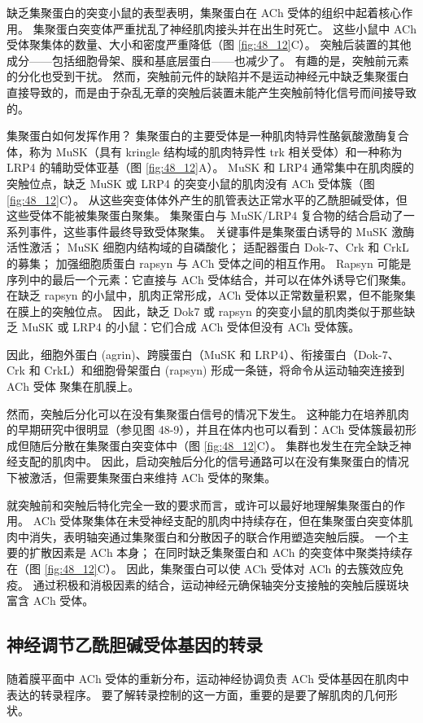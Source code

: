 缺乏集聚蛋白的突变小鼠的表型表明，集聚蛋白在 ACh 受体的组织中起着核心作用。 集聚蛋白突变体严重扰乱了神经肌肉接头并在出生时死亡。 这些小鼠中 ACh 受体聚集体的数量、大小和密度严重降低（图 \ref{fig:48_12}C）。 突触后装置的其他成分——包括细胞骨架、膜和基底层蛋白——也减少了。 有趣的是，突触前元素的分化也受到干扰。 然而，突触前元件的缺陷并不是运动神经元中缺乏集聚蛋白直接导致的，而是由于杂乱无章的突触后装置未能产生突触前特化信号而间接导致的。

集聚蛋白如何发挥作用？ 集聚蛋白的主要受体是一种肌肉特异性酪氨酸激酶复合体，称为 MuSK（具有 kringle 结构域的肌肉特异性 trk 相关受体）和一种称为 LRP4 的辅助受体亚基（图 \ref{fig:48_12}A）。 MuSK 和 LRP4 通常集中在肌肉膜的突触位点，缺乏 MuSK 或 LRP4 的突变小鼠的肌肉没有 ACh 受体簇（图 \ref{fig:48_12}C）。 从这些突变体体外产生的肌管表达正常水平的乙酰胆碱受体，但这些受体不能被集聚蛋白聚集。 集聚蛋白与 MuSK/LRP4 复合物的结合启动了一系列事件，这些事件最终导致受体聚集。 关键事件是集聚蛋白诱导的 MuSK 激酶活性激活； MuSK 细胞内结构域的自磷酸化； 适配器蛋白 Dok-7、Crk 和 CrkL 的募集； 加强细胞质蛋白 rapsyn 与 ACh 受体之间的相互作用。 Rapsyn 可能是序列中的最后一个元素：它直接与 ACh 受体结合，并可以在体外诱导它们聚集。 在缺乏 rapsyn 的小鼠中，肌肉正常形成，ACh 受体以正常数量积累，但不能聚集在膜上的突触位点。 因此，缺乏 Dok7 或 rapsyn 的突变小鼠的肌肉类似于那些缺乏 MuSK 或 LRP4 的小鼠：它们合成 ACh 受体但没有 ACh 受体簇。

因此，细胞外蛋白 (agrin)、跨膜蛋白（MuSK 和 LRP4）、衔接蛋白（Dok-7、Crk 和 CrkL）和细胞骨架蛋白 (rapsyn) 形成一条链，将命令从运动轴突连接到 ACh 受体 聚集在肌膜上。

然而，突触后分化可以在没有集聚蛋白信号的情况下发生。 这种能力在培养肌肉的早期研究中很明显（参见图 48-9），并且在体内也可以看到：ACh 受体簇最初形成但随后分散在集聚蛋白突变体中（图 \ref{fig:48_12}C）。 集群也发生在完全缺乏神经支配的肌肉中。 因此，启动突触后分化的信号通路可以在没有集聚蛋白的情况下被激活，但需要集聚蛋白来维持 ACh 受体的聚集。

就突触前和突触后特化完全一致的要求而言，或许可以最好地理解集聚蛋白的作用。 ACh 受体聚集体在未受神经支配的肌肉中持续存在，但在集聚蛋白突变体肌肉中消失，表明轴突通过集聚蛋白和分散因子的联合作用塑造突触后膜。 一个主要的扩散因素是 ACh 本身； 在同时缺乏集聚蛋白和 ACh 的突变体中聚类持续存在（图 \ref{fig:48_12}C）。 因此，集聚蛋白可以使 ACh 受体对 ACh 的去簇效应免疫。 通过积极和消极因素的结合，运动神经元确保轴突分支接触的突触后膜斑块富含 ACh 受体。

\subsection{神经调节乙酰胆碱受体基因的转录}
随着膜平面中 ACh 受体的重新分布，运动神经协调负责 ACh 受体基因在肌肉中表达的转录程序。 要了解转录控制的这一方面，重要的是要了解肌肉的几何形状。

